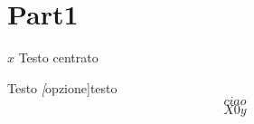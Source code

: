\documentclass[border=10pt]{book}
\begin{document}
\part{Part1}

\begin{center}

	$x$
	Testo centrato
\end{center}

Testo \emph[opzione]{testo}
$$ciao$$
\begin{equation}
X0y
\end{equation}
\end{document}
